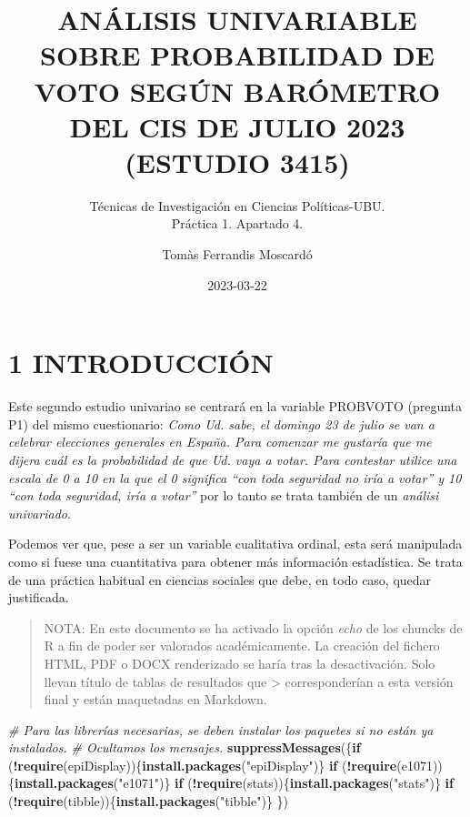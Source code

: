 \documentclass[
]{article}
\title{ANÁLISIS UNIVARIABLE SOBRE PROBABILIDAD DE VOTO SEGÚN BARÓMETRO
DEL CIS DE JULIO 2023\\
(ESTUDIO 3415)}
\subtitle{Técnicas de Investigación en Ciencias Políticas-UBU.\\
Práctica 1. Apartado 4.}
\author{Tomàs Ferrandis Moscardó}
\date{2023-03-22}
\newenvironment{Shaded}{\begin{snugshade}}{\end{snugshade}}
\newcommand{\CommentTok}[1]{\textcolor[rgb]{0.56,0.35,0.01}{\textit{#1}}}
\newcommand{\ControlFlowTok}[1]{\textcolor[rgb]{0.13,0.29,0.53}{\textbf{#1}}}
\newcommand{\FunctionTok}[1]{\textcolor[rgb]{0.13,0.29,0.53}{\textbf{#1}}}
\newcommand{\NormalTok}[1]{#1}
\newcommand{\SpecialCharTok}[1]{\textcolor[rgb]{0.81,0.36,0.00}{\textbf{#1}}}
\newcommand{\StringTok}[1]{\textcolor[rgb]{0.31,0.60,0.02}{#1}}
\begin{document}
\maketitle

{
\setcounter{tocdepth}{2}
\tableofcontents
}
\newpage

\hypertarget{introducciuxf3n}{%
\section{1 INTRODUCCIÓN}\label{introducciuxf3n}}

Este segundo estudio univariao se centrará en la variable PROBVOTO
(pregunta P1) del mismo cuestionario: \emph{Como Ud. sabe, el domingo 23
de julio se van a celebrar elecciones generales en España. Para comenzar
me gustaría que me dijera cuál es la probabilidad de que Ud. vaya a
votar. Para contestar utilice una escala de 0 a 10 en la que el 0
significa ``con toda seguridad no iría a votar'' y 10 ``con toda
seguridad, iría a votar''} por lo tanto se trata también de un
\emph{análisi univariado}.

Podemos ver que, pese a ser un variable cualitativa ordinal, esta será
manipulada como si fuese una cuantitativa para obtener más información
estadística. Se trata de una práctica habitual en ciencias sociales que
debe, en todo caso, quedar justificada.

\begin{quote}
NOTA: En este documento se ha activado la opción \emph{echo} de los
chuncks de R a fin de poder ser valorados académicamente. La creación
del fichero HTML, PDF o DOCX renderizado se haría tras la desactivación.
Solo llevan título de tablas de resultados que \textgreater{}
corresponderían a esta versión final y están maquetadas en Markdown.
\end{quote}

\begin{Shaded}
\begin{Highlighting}[]
\CommentTok{\# Para las librerías necesarias, se deben instalar los paquetes si no están ya instalados. }
\CommentTok{\# Ocultamos los mensajes.}
\FunctionTok{suppressMessages}\NormalTok{(\{}\ControlFlowTok{if}\NormalTok{ (}\SpecialCharTok{!}\FunctionTok{require}\NormalTok{(epiDisplay))\{}\FunctionTok{install.packages}\NormalTok{(}\StringTok{"epiDisplay"}\NormalTok{)\}}
\ControlFlowTok{if}\NormalTok{ (}\SpecialCharTok{!}\FunctionTok{require}\NormalTok{(e1071))\{}\FunctionTok{install.packages}\NormalTok{(}\StringTok{"e1071"}\NormalTok{)\}}
\ControlFlowTok{if}\NormalTok{ (}\SpecialCharTok{!}\FunctionTok{require}\NormalTok{(stats))\{}\FunctionTok{install.packages}\NormalTok{(}\StringTok{"stats"}\NormalTok{)\}}
\ControlFlowTok{if}\NormalTok{ (}\SpecialCharTok{!}\FunctionTok{require}\NormalTok{(tibble))\{}\FunctionTok{install.packages}\NormalTok{(}\StringTok{"tibble"}\NormalTok{)\}}
\NormalTok{\})}
\end{Highlighting}
\end{Shaded}
\end{document}
